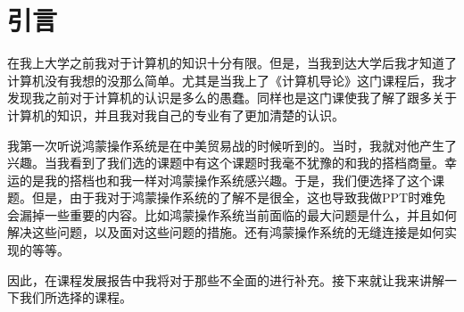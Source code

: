 \documentclass{article}
\begin{document}
\thispagestyle{empty}
\newpage
\setcounter{page}{1}
\section{引言}
    在我上大学之前我对于计算机的知识十分有限。但是，当我到达大学后我才知道了计算机没有我想的没那么简单。尤其是当我上了《计算机导论》这门课程后，我才发现我之前对于计算机的认识是多么的愚蠢。同样也是这门课使我了解了跟多关于计算机的知识，并且我对我自己的专业有了更加清楚的认识。

    我第一次听说鸿蒙操作系统是在中美贸易战的时候听到的。当时，我就对他产生了兴趣。当我看到了我们选的课题中有这个课题时我毫不犹豫的和我的搭档商量。幸运的是我的搭档也和我一样对鸿蒙操作系统感兴趣。于是，我们便选择了这个课题。但是，由于我对于鸿蒙操作系统的了解不是很全，这也导致我做PPT时难免会漏掉一些重要的内容。比如鸿蒙操作系统当前面临的最大问题是什么，并且如何解决这些问题，以及面对这些问题的措施。还有鸿蒙操作系统的无缝连接是如何实现的等等。

    因此，在课程发展报告中我将对于那些不全面的进行补充。接下来就让我来讲解一下我们所选择的课程。\par
\end{document}
